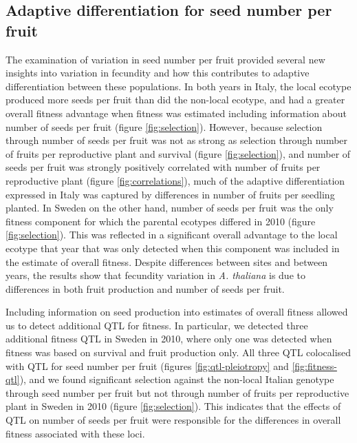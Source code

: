 \documentclass[12pt,]{article}
\begin{document}
\hypertarget{adaptive-differentiation-for-seed-number-per-fruit}{%
\subsection{Adaptive differentiation for seed number per fruit}\label{adaptive-differentiation-for-seed-number-per-fruit}}

The examination of variation in seed number per fruit provided several new insights into variation in fecundity and how this contributes to adaptive differentiation between these populations.
In both years in Italy, the local ecotype produced more seeds per fruit than did the non-local ecotype, and had a greater overall fitness advantage when fitness was estimated including information about number of seeds per fruit (figure \ref{fig:selection}).
However, because selection through number of seeds per fruit was not as strong as selection through number of fruits per reproductive plant and survival (figure \ref{fig:selection}), and number of seeds per fruit was strongly positively correlated with number of fruits per reproductive plant (figure \ref{fig:correlations}), much of the adaptive differentiation expressed in Italy was captured by differences in number of fruits per seedling planted.
In Sweden on the other hand, number of seeds per fruit was the only fitness component for which the parental ecotypes differed in 2010 (figure \ref{fig:selection}).
This was reflected in a significant overall advantage to the local ecotype that year that was only detected when this component was included in the estimate of overall fitness.
Despite differences between sites and between years, the results show that fecundity variation in \emph{A. thaliana} is due to differences in both fruit production and number of seeds per fruit.

Including information on seed production into estimates of overall fitness allowed us to detect additional QTL for fitness. In particular, we detected three additional fitness QTL in Sweden in 2010, where only one was detected when fitness was based on survival and fruit production only. All three QTL colocalised with QTL for seed number per fruit (figures \ref{fig:qtl-pleiotropy} and \ref{fig:fitness-qtl}), and we found significant selection against the non-local Italian genotype through seed number per fruit but not through number of fruits per reproductive plant in Sweden in 2010 (figure \ref{fig:selection}). This indicates that the effects of QTL on number of seeds per fruit were responsible for the differences in overall fitness associated with these loci.
\end{document}
